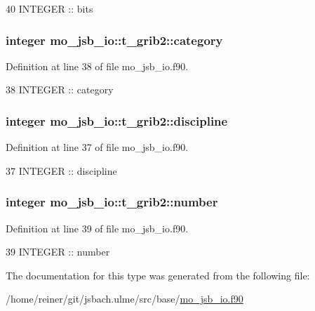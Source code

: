 \begin{DoxyCode}
40     \textcolor{keywordtype}{INTEGER} :: bits
\end{DoxyCode}
\hypertarget{structmo__jsb__io_1_1t__grib2_a63807a398f2470394f9dd992291e068c}{}
\subsubsection[{category}]{\setlength{\rightskip}{0pt plus 5cm}integer mo\+\_\+jsb\+\_\+io\+::t\+\_\+grib2\+::category}\label{structmo__jsb__io_1_1t__grib2_a63807a398f2470394f9dd992291e068c}


Definition at line 38 of file mo\+\_\+jsb\+\_\+io.\+f90.


\begin{DoxyCode}
38     \textcolor{keywordtype}{INTEGER} :: category
\end{DoxyCode}
\hypertarget{structmo__jsb__io_1_1t__grib2_a6d04e119119126e03f70302404322e9e}{}
\subsubsection[{discipline}]{\setlength{\rightskip}{0pt plus 5cm}integer mo\+\_\+jsb\+\_\+io\+::t\+\_\+grib2\+::discipline}\label{structmo__jsb__io_1_1t__grib2_a6d04e119119126e03f70302404322e9e}


Definition at line 37 of file mo\+\_\+jsb\+\_\+io.\+f90.


\begin{DoxyCode}
37     \textcolor{keywordtype}{INTEGER} :: discipline
\end{DoxyCode}
\hypertarget{structmo__jsb__io_1_1t__grib2_a64b203ca59562151da1e7b55913cb31c}{}
\subsubsection[{number}]{\setlength{\rightskip}{0pt plus 5cm}integer mo\+\_\+jsb\+\_\+io\+::t\+\_\+grib2\+::number}\label{structmo__jsb__io_1_1t__grib2_a64b203ca59562151da1e7b55913cb31c}


Definition at line 39 of file mo\+\_\+jsb\+\_\+io.\+f90.


\begin{DoxyCode}
39     \textcolor{keywordtype}{INTEGER} :: number
\end{DoxyCode}


The documentation for this type was generated from the following file\+:\begin{DoxyCompactItemize}
\item 
/home/reiner/git/jsbach.\+ulme/src/base/\hyperlink{mo__jsb__io_8f90}{mo\+\_\+jsb\+\_\+io.\+f90}\end{DoxyCompactItemize}
